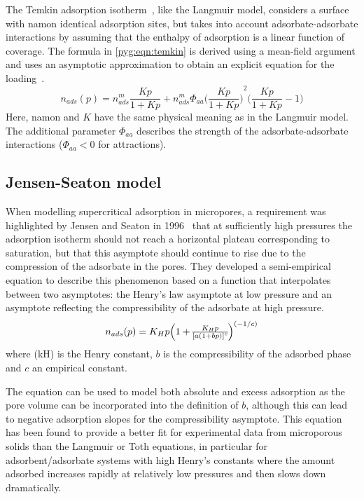 The Temkin adsorption
isotherm~\cite{temkinKineticsAmmoniaSynthesis1940},
like the Langmuir model, considers
a surface with \gls{namon} identical adsorption sites, but takes into
account adsorbate-adsorbate interactions by assuming that the
enthalpy of adsorption is a linear function of coverage.
The formula in \autoref{pyg:eqn:temkin} is derived
using a mean-field argument and uses an asymptotic approximation
to obtain an explicit equation for the
loading~\cite{simonOptimizingNanoporousMaterials2014}.
%
\begin{equation}\label{pyg:eqn:temkin}
	n_{ads}(p) = n_{ads}^m \frac{Kp}{1+Kp} + n_{ads}^m \Phi_{aa}
	{\Big(\frac{Kp}{1+Kp}\Big)}^2 \Big(\frac{Kp}{1+Kp} -1\Big)
\end{equation}
%
Here, \gls{namon} and \(K\) have the same physical meaning as in the
Langmuir model.
The additional parameter \(\Phi_{aa}\) describes the strength of the
adsorbate-adsorbate
interactions (\(\Phi_{aa} < 0\) for attractions).

\subsection{Jensen-Seaton model}\label{pyg:models:jseaton}

When modelling supercritical adsorption in micropores, a requirement was
highlighted by
Jensen and Seaton in 1996~\cite{jensenIsothermEquationAdsorption1996}
that at sufficiently high pressures the adsorption
isotherm should not reach a horizontal plateau corresponding to
saturation, but that this asymptote should continue to rise due to
the compression of the adsorbate in the pores. They developed a
semi-empirical equation to describe this phenomenon based on a function
that interpolates between two asymptotes: the Henry’s law asymptote at
low pressure and an asymptote reflecting the compressibility of
the adsorbate at high pressure.
%
\begin{equation}\label{pyg:eqn:jseaton}
	n_{ads}(p) = K_H p \Big{(1 + \frac{K_H p}{{[a {(1 + b
									p)}]}^c}\Big)}^{(-1/c)}
\end{equation}
%
where (\gls{kH}) is the Henry constant, \(b\) is the compressibility of
the adsorbed phase and \(c\) an empirical constant.

The equation can be used to model both absolute and excess adsorption
as the pore volume can be incorporated into the definition of \(b\),
although this can lead to negative adsorption slopes for the
compressibility asymptote. This equation has been found to provide a
better fit for experimental data from microporous solids than the
Langmuir or Toth equations, in particular for
adsorbent/adsorbate systems with high Henry’s constants where the
amount adsorbed increases rapidly at relatively low pressures and
then slows down dramatically.

